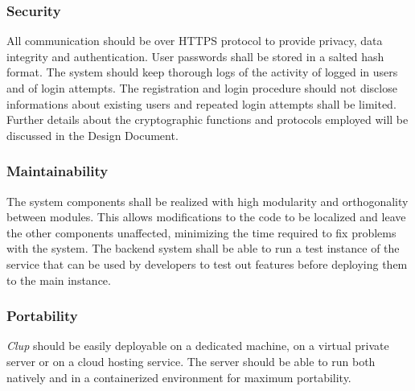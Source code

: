 \subsubsection{Security}
All communication should be over HTTPS protocol to provide privacy, data integrity and authentication.
User passwords shall be stored in a salted hash format.
The system should keep thorough logs of the activity of logged in users and of login attempts. The registration and login procedure should not disclose informations about existing users and repeated login attempts shall be limited.
Further details about the cryptographic functions and protocols employed will be discussed in the Design Document.
\subsubsection{Maintainability}
The system components shall be realized with high modularity and orthogonality between modules. This allows modifications to the code to be localized and leave the other components unaffected, minimizing the time required to fix problems with the system.
The backend system shall be able to run a test instance of the service that can be used by developers to test out features before deploying them to the main instance.
\subsubsection{Portability}
\textit{Clup} should be easily deployable on a dedicated machine, on a virtual private server or on a cloud hosting service. The server should be able to run both natively and in a containerized environment for maximum portability.
